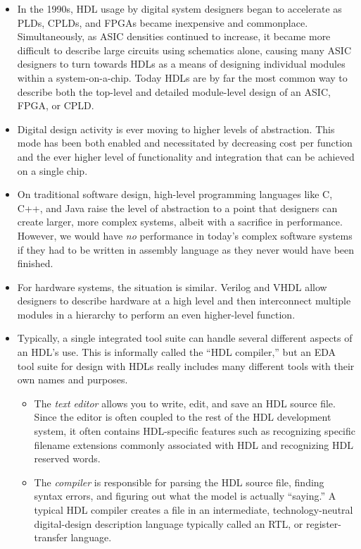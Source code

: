 \documentclass[10pt,a4paper]{article}
\begin{document}
\begin{itemize}
\item In the 1990s, HDL usage by digital system designers began to accelerate as PLDs, CPLDs, and FPGAs became inexpensive and commonplace. Simultaneously, as ASIC densities continued to increase, it became more difficult to describe large circuits using schematics alone, causing many ASIC designers to turn towards HDLs as a means of designing individual modules within a system-on-a-chip. Today HDLs are by far the most common way to describe both the top-level and detailed module-level design of an ASIC, FPGA, or CPLD. 
\item Digital design activity is ever moving to higher levels of abstraction. This mode has been both enabled and necessitated by decreasing cost per function and the ever higher level of functionality and integration that can be achieved on a single chip.
\item On traditional software design, high-level programming languages like C, C++, and Java raise the level of abstraction to a point that designers can create larger, more complex systems, albeit with a sacrifice in performance. However, we would have \textit{no} performance in today's complex software systems if they had to be written in assembly language as they never would have been finished. 
\item For hardware systems, the situation is similar. Verilog and VHDL allow designers to describe hardware at a high level and then interconnect multiple modules in a hierarchy to perform an even higher-level function.
\item Typically, a single integrated tool suite can handle several different aspects of an HDL's use. This is informally called the ``HDL compiler,'' but an EDA tool suite for design with HDLs really includes many different tools with their own names and purposes.
\begin{itemize}
\item The \textit{text editor} allows you to write, edit, and save an HDL source file. Since the editor is often coupled to the rest of the HDL development system, it often contains HDL-specific features such as recognizing specific filename extensions commonly associated with HDL and recognizing HDL reserved words. 
\item The \textit{compiler} is responsible for parsing the HDL source file, finding syntax errors, and figuring out what the model is actually ``saying.'' A typical HDL compiler creates a file in an intermediate, technology-neutral digital-design description language typically called an RTL, or register-transfer language.

\end{itemize}
\end{itemize}
\end{document}
